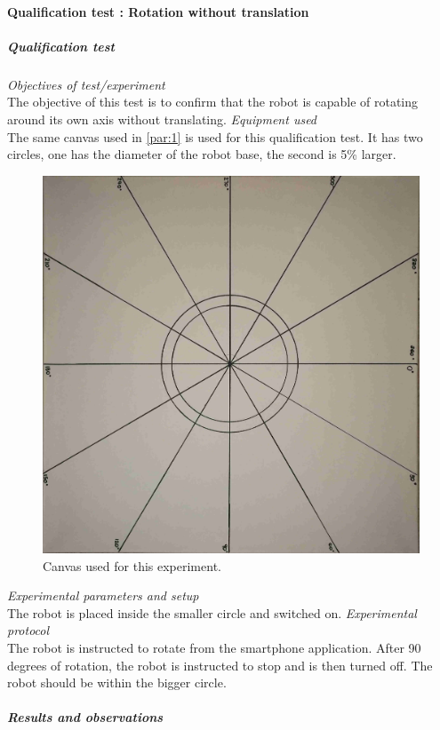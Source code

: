 \paragraph{Qualification test  : Rotation without translation}
\subparagraph{Qualification test}
\textit{Objectives of test/experiment}\\
The objective of this test is to confirm that the robot is capable of rotating around its own axis without translating.
\textit{Equipment used}\\
The same canvas used in \ref{par:1} is used for this qualification test. It has two circles, one has the diameter of the robot base, the second is 5\% larger.
\begin{figure}[H]
\centering
\includegraphics[scale = 1]{pics/Res2.jpg}
\caption{Canvas used for this experiment.}
\label{fig:Res2}
\end{figure}
\textit{Experimental parameters and setup }\\
The robot is placed inside the smaller circle and switched on.
\textit{Experimental protocol}\\
The robot is instructed to rotate from the smartphone application. After 90 degrees of rotation, the robot is instructed to stop and is then turned off. The robot should be within the bigger circle.
\subparagraph{Results and observations}

